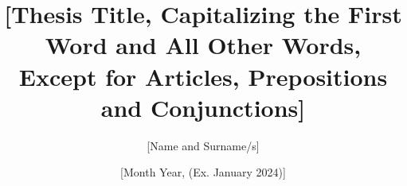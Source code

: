 \newcommand{\Studies}{[Studies, ex. Master]}

\newcommand{\StudiesTitle}{[Studies Title, (ex. Engineering)]}

\newcommand{\Department}{[Department /School, (ex. Engineering School)]}

\newcommand{\AuthorName}{[Name and Surname/s]}

\newcommand{\ThesisTitle}{[Thesis Title, Capitalizing the First Word and All Other Words, Except for Articles, Prepositions and Conjunctions]}

\newcommand{\Date}{[Month Year, (Ex. January 2024)]}

\title{\ThesisTitle}
\author{\AuthorName}
\date{\Date}
